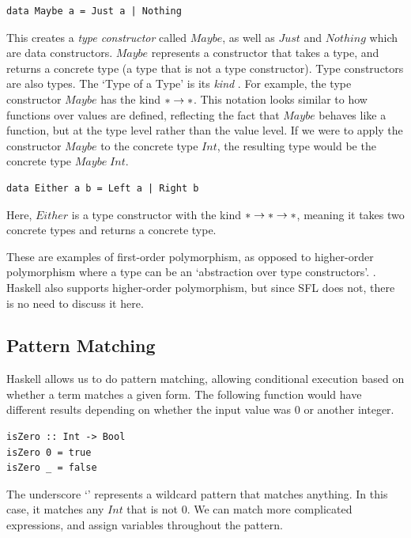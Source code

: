 \begin{lstlisting}[language=SFL_noprelude]
data Maybe a = Just a | Nothing
\end{lstlisting} 

\noindent This creates a \textit{type constructor} called \(Maybe\), as well as $Just$ and $Nothing$ which are data constructors. $Maybe$ represents a constructor that takes a type, and returns a concrete type (a type that is not a type constructor). Type constructors are also types. 
The `Type of a Type' is its \emph{kind} \cite{pierce2002types}. For example, the type constructor $Maybe$ has the kind $* \rightarrow *$. This notation looks similar to how functions over values are defined, reflecting the fact that $Maybe$ behaves like a function, but at the type level rather than the value level. If we were to apply the constructor \(Maybe\) to the concrete type \(Int\), the resulting type would be the concrete type \(Maybe \;Int\). 

\begin{lstlisting}[language=SFL_noprelude]
data Either a b = Left a | Right b
\end{lstlisting} 

\noindent Here, $Either$ is a type constructor with the kind $* \rightarrow * \rightarrow *$, meaning it takes two concrete types and returns a concrete type. 

These are examples of first-order polymorphism, as opposed to higher-order polymorphism where a type can be an `abstraction over type constructors'. \cite{yallop2014lightweightpoly}. Haskell also supports higher-order polymorphism, but since \ac{SFL} does not, there is no need to discuss it here.

\subsection{Pattern Matching}
\label{bg:haskell_pattern_match}
Haskell allows us to do pattern matching, allowing conditional execution based on whether a term matches a given form. The following function would have different results depending on whether the input value was 0 or another integer.

\begin{lstlisting}[language=SFL]
isZero :: Int -> Bool
isZero 0 = true
isZero _ = false
\end{lstlisting}

\noindent The underscore `\sflinline{_}' represents a wildcard pattern that matches anything. In this case, it matches any $Int$ that is not $0$. We can match more complicated expressions, and assign variables throughout the pattern.

